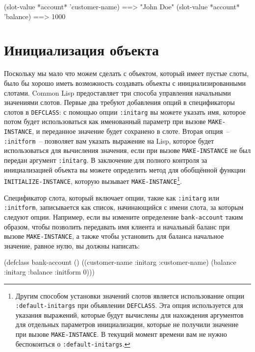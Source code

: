 \begin{myverb}
  (slot-value *account* 'customer-name) ==> "John Doe"
  (slot-value *account* 'balance)       ==> 1000
\end{myverb}

\section{Инициализация объекта}

Поскольку мы мало что можем сделать с объектом, который имеет пустые слоты, было бы хорошо
иметь возможность создавать объекты с инициализированными слотами.  Common Lisp
предоставляет три способа управления начальными значениями слотов.  Первые два требуют
добавления опций в спецификаторы слотов в \lstinline{DEFCLASS}: с помощью опции
\lstinline{:initarg} вы можете указать имя, которое потом будет использоваться как
именованный параметр при вызове \lstinline{MAKE-INSTANCE}, и переданное значение будет
сохранено в слоте.  Вторая опция~-- \lstinline{:initform}~-- позволяет вам указать выражение
на Lisp, которое будет использоваться для вычисления значения, если при вызове
\lstinline{MAKE-INSTANCE} не был передан аргумент \lstinline{:initarg}.  В заключение
для полного контроля за инициализацией объекта вы можете определить метод для обобщённой
функции \lstinline{INITIALIZE-INSTANCE}, которую вызывает
\lstinline{MAKE-INSTANCE}\footnote{Другим способом установки значений слотов является
  использование опции \lstinline{:default-initargs} при объявлении \lstinline{DEFCLASS}.
  Эта опция используется для указания выражений, которые будут вычислены для нахождения
  аргументов для отдельных параметров инициализации, которые не получили значение при
  вызове \lstinline{MAKE-INSTANCE}.  В текущий момент времени вам не нужно беспокоиться о
  \lstinline{:default-initargs}.}.

Спецификатор слота, который включает опции, такие как \lstinline{:initarg} или
\lstinline{:initform}, записывается как список, начинающийся с имени слота, за которым следуют
опции.  Например, если вы измените определение \lstinline{bank-account} таким образом, чтобы
позволить передавать имя клиента и начальный баланс при вызове \lstinline{MAKE-INSTANCE}, а
также чтобы установить для баланса начальное значение, равное нулю, вы должны написать:

\begin{myverb}
(defclass bank-account ()
  ((customer-name
    :initarg :customer-name)
   (balance
    :initarg :balance
    :initform 0)))
\end{myverb}

